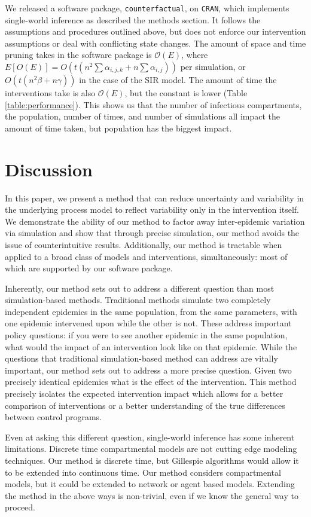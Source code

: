 \documentclass[PTRSB]{rsos}
\begin{document}
\begin{multicols}{2}
We released a software package, \texttt{counterfactual}, on \texttt{CRAN}, %
which implements single-world inference as described the methods section.
It follows the assumptions and procedures outlined above, but does not enforce our intervention assumptions or deal with conflicting state changes.
The amount of space and time pruning takes in the software package is $\mathcal O(E)$, where $E[O(E)] = O(t(n^2\sum \alpha_{i,j,k} + n \sum\alpha_{i,j}))$ per simulation, or $O(t(n^2\beta + n\gamma))$ in the case of the SIR model.
The amount of time the interventions take is also $\mathcal O(E)$, but the constant is lower (Table \ref{table:performance}).
This shows us that the number of infectious compartments, the population, number of times, and number of simulations all impact the amount of time taken, but population has the biggest impact.

\section{Discussion}
In this paper, we present a method that can reduce uncertainty and variability in the underlying process model to reflect variability only in the intervention itself.
We demonstrate the ability of our method to factor away inter-epidemic variation via simulation and show that through precise simulation, our method avoids the issue of counterintuitive results. 
Additionally, our method is tractable when applied to a broad class of models and interventions, simultaneously: most of which are supported by our software package.

Inherently, our method sets out to address a different question than most simulation-based methods. 
Traditional methods simulate two completely independent epidemics in the same population, from the same parameters, with one epidemic intervened upon while the other is not. 
These address important policy questions: if you were to see another epidemic in the same population, what would the impact of an intervention look like on that epidemic. 
While the questions that traditional simulation-based method can address are vitally important, our method sets out to address a more precise question. 
Given two precisely identical epidemics what is the effect of the intervention. 
This method precisely isolates the expected intervention impact which allows for a better comparison of interventions or a better understanding of the true differences between control programs.

Even at asking this different question, single-world inference has some inherent limitations.
Discrete time compartmental models are not cutting edge modeling techniques.
Our method is discrete time, but Gillespie algorithms would allow it to be extended into continuous time.
Our method considers compartmental models, but it could be extended to network or agent based models.
Extending the method in the above ways is non-trivial, even if we know the general way to proceed.


\end{multicols}
\end{document}
